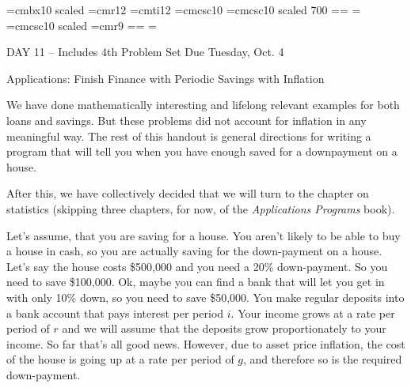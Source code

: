 
\def\folio{\ifnum\pageno>0 \number\pageno \else
   \ifnum\pageno<0 \romannumeral-\pageno \else\fi\fi}

\font\largebf=cmbx10  scaled 
\font\largerm=cmr12
\font\largeit=cmti12
\font\tensc=cmcsc10
\font\sevensc=cmcsc10 scaled 700
\newfam\scfam \def\sc{\fam\scfam\tensc}
\textfont\scfam=\tensc \scriptfont\scfam=\sevensc
\scriptscriptfont\scfam=\sevensc
\font\largesc=cmcsc10 scaled 
\font\ninerm=cmr9
\newfam\srfam \def\sr{\fam\srfam\ninerm}
\textfont\srfam=\ninerm \scriptfont\srfam=\sevenrm
\scriptscriptfont\srfam=\fiverm




\null\vskip36pt

\centerline{\largerm DAY 11 -- Includes 4th Problem Set Due Tuesday, Oct. 4}
\nobreak\bigskip

\centerline{\largeit Applications: Finish Finance with Periodic Savings with Inflation}
\nobreak\bigskip

\nobreak\bigskip

\noindent  We have done mathematically interesting and lifelong relevant examples for both loans and savings. But these problems did not account for inflation in any meaningful way. The rest of this handout is general directions for writing a program that will tell you when you have enough saved for a downpayment on a house.

After this, we have collectively decided that we will turn to the chapter on statistics (skipping three chapters, for now, of the {\it Applications Programs} book).

\bigskip

\nobreak\bigskip

\nobreak\bigskip

\noindent Let's assume, that you are saving for a house. You aren't likely to be able to buy a house in cash, so you are actually saving for the down-payment on a house. Let's say the house costs \$500,000 and you need a 20\% down-payment. So you need to save \$100,000. Ok, maybe you can find a bank that will let you get in with only 10\% down, so you need to save \$50,000. You make regular deposits into a bank account that pays interest per period $i$. Your income grows at a rate per period of $r$ and we will assume that the deposits grow proportionately to your income. So far that's all good news. However, due to asset price inflation, the cost of the house is going up at a rate per period of $g$, and therefore so is the required down-payment.

